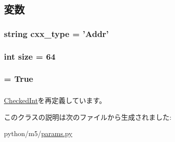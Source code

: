 \subsection{変数}
\hypertarget{classm5_1_1params_1_1Addr_a2f1553ebb79374a68b36fdd6d8d82fc3}{
\subsubsection[{cxx\_\-type}]{\setlength{\rightskip}{0pt plus 5cm}string {\bf cxx\_\-type} = '{\bf Addr}'}}
\label{classm5_1_1params_1_1Addr_a2f1553ebb79374a68b36fdd6d8d82fc3}
\hypertarget{classm5_1_1params_1_1Addr_a439227feff9d7f55384e8780cfc2eb82}{
\subsubsection[{size}]{\setlength{\rightskip}{0pt plus 5cm}int {\bf size} = 64}}
\label{classm5_1_1params_1_1Addr_a439227feff9d7f55384e8780cfc2eb82}
\hypertarget{classm5_1_1params_1_1Addr_aca40206900cfc164654362fa8d4ad1e6}{
\subsubsection[{unsigned}]{ = True}}
\label{classm5_1_1params_1_1Addr_aca40206900cfc164654362fa8d4ad1e6}
\hypertarget{classm5_1_1params_1_1Addr_afcc7a4b78ecd8fa7e713f8cfa0f51017}{
\subsubsection[{value}]{}}
\label{classm5_1_1params_1_1Addr_afcc7a4b78ecd8fa7e713f8cfa0f51017}


\hyperlink{classm5_1_1params_1_1CheckedInt_afcc7a4b78ecd8fa7e713f8cfa0f51017}{CheckedInt}を再定義しています。

このクラスの説明は次のファイルから生成されました:\begin{DoxyCompactItemize}
\item 
python/m5/\hyperlink{params_8py}{params.py}\end{DoxyCompactItemize}
